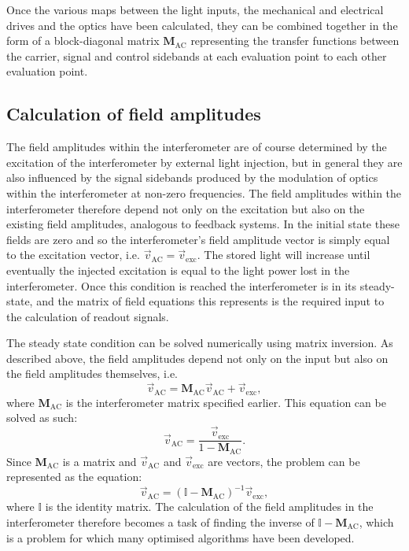 Once the various maps between the light inputs, the mechanical and electrical drives and the optics have been calculated, they can be combined together in the form of a block-diagonal matrix $\mathbf{M}_{\text{AC}}$ representing the transfer functions between the carrier, signal and control sidebands at each evaluation point to each other evaluation point.

\subsection{Calculation of field amplitudes}
The field amplitudes within the interferometer are of course determined by the excitation of the interferometer by external light injection, but in general they are also influenced by the signal sidebands produced by the modulation of optics within the interferometer at non-zero frequencies. The field amplitudes within the interferometer therefore depend not only on the excitation but also on the existing field amplitudes, analogous to feedback systems. In the initial state these fields are zero and so the interferometer's field amplitude vector is simply equal to the excitation vector, i.e. $\vec{v}_{\text{AC}} = \vec{v}_{\text{exc}}$. The stored light will increase until eventually the injected excitation is equal to the light power lost in the interferometer. Once this condition is reached the interferometer is in its steady-state, and the matrix of field equations this represents is the required input to the calculation of readout signals.

The steady state condition can be solved numerically using matrix inversion. As described above, the field amplitudes depend not only on the input but also on the field amplitudes themselves, i.e.
\begin{equation}
  \vec{v}_{\text{AC}} = \mathbf{M}_{\text{AC}} \vec{v}_{\text{AC}} + \vec{v}_{\text{exc}},
\end{equation}
where $\mathbf{M}_{\text{AC}}$ is the interferometer matrix specified earlier. This equation can be solved as such:
\begin{equation}
  \vec{v}_{\text{AC}} = \frac{\vec{v}_{\text{exc}}}{1 - \mathbf{M}_{\text{AC}}}.
\end{equation}
Since $\mathbf{M}_{\text{AC}}$ is a matrix and $\vec{v}_{\text{AC}}$ and $\vec{v}_{\text{exc}}$ are vectors, the problem can be represented as the equation:
\begin{equation}
  \vec{v}_{\text{AC}} = \left( \mathbb{I} - \mathbf{M}_{\text{AC}} \right)^{-1} \vec{v}_{\text{exc}},
\end{equation}
where $\mathbb{I}$ is the identity matrix. The calculation of the field amplitudes in the interferometer therefore becomes a task of finding the inverse of $\mathbb{I} - \mathbf{M}_{\text{AC}}$, which is a problem for which many optimised algorithms have been developed.

